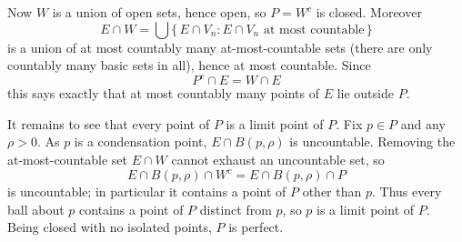 \documentclass[main.tex]{subfiles}
\begin{document}
\begin{SolutionBlue}
Now $W$ is a union of open sets, hence open, so $P=W^{c}$ is closed. Moreover
\[
E\cap W=\bigcup\{\,E\cap V_n:E\cap V_n\text{ at most countable}\,\}
\]
is a union of at most countably many at-most-countable sets (there are only countably many basic sets in
all), hence at most countable. Since
\[
P^{c}\cap E=W\cap E
\]
this says exactly that at most countably many points of $E$ lie outside $P$.

It remains to see that every point of $P$ is a limit point of $P$. Fix $p\in P$ and any $\rho>0$. As $p$
is a condensation point, $E\cap B(p,\rho)$ is uncountable. Removing the at-most-countable set $E\cap W$
cannot exhaust an uncountable set, so
\[
E\cap B(p,\rho)\cap W^{c}=E\cap B(p,\rho)\cap P
\]
is uncountable; in particular it contains a point of $P$ other than $p$. Thus every ball about $p$
contains a point of $P$ distinct from $p$, so $p$ is a limit point of $P$. Being closed with no isolated
points, $P$ is perfect.
\end{SolutionBlue}
\end{document}

